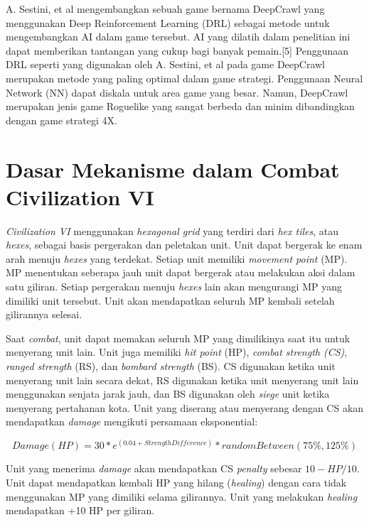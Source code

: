 A. Sestini, et al \citep{deepCrawl} mengembangkan sebuah game bernama DeepCrawl yang menggunakan Deep Reinforcement Learning (DRL) sebagai metode untuk mengembangkan AI dalam game tersebut. AI yang dilatih dalam penelitian ini dapat memberikan tantangan yang cukup bagi banyak pemain.[5] Penggunaan DRL seperti yang digunakan oleh A. Sestini, et al pada game DeepCrawl merupakan metode yang paling optimal dalam game strategi. Penggunaan Neural Network (NN) dapat diskala untuk area game yang besar. Namun, DeepCrawl merupakan jenis game Roguelike yang sangat berbeda dan minim dibandingkan dengan game strategi 4X.

\section{Dasar Mekanisme dalam Combat Civilization VI}
\emph{Civilization VI} menggunakan \emph{hexagonal grid} yang terdiri dari \emph{hex tiles}, atau \emph{hexes}, sebagai basis pergerakan dan peletakan unit. 
Unit dapat bergerak ke enam arah menuju \emph{hexes} yang terdekat. Setiap unit memiliki \emph{movement point} (MP). 
MP menentukan seberapa jauh unit dapat bergerak atau melakukan aksi dalam satu giliran. 
Setiap pergerakan menuju \emph{hexes} lain akan mengurangi MP yang dimiliki unit tersebut.
Unit akan mendapatkan seluruh MP kembali setelah gilirannya selesai.

Saat \emph{combat}, unit dapat memakan seluruh MP yang dimilikinya saat itu untuk menyerang unit lain.
Unit juga memiliki \emph{hit point} (HP), \emph{combat strength (CS)}, \emph{ranged strength} (RS), dan \emph{bombard strength} (BS).
CS digunakan ketika unit menyerang unit lain secara dekat, RS digunakan ketika unit menyerang unit lain menggunakan senjata jarak jauh, dan BS digunakan oleh \emph{siege} unit ketika menyerang pertahanan kota.
Unit yang diserang atau menyerang dengan CS akan mendapatkan \emph{damage} mengikuti persamaan eksponential\citep{civ6Combat}:

\[Damage(HP) = 30 * e^{(0.04+StrengthDifference)} * randomBetween(75\%, 125\%)\]

Unit yang menerima \emph{damage} akan mendapatkan CS \emph{penalty} sebesar \(10 - HP/10\).
Unit dapat mendapatkan kembali HP yang hilang (\emph{healing}) dengan cara tidak menggunakan MP yang dimiliki selama gilirannya.
Unit yang melakukan \emph{healing} mendapatkan +10 HP per giliran.

